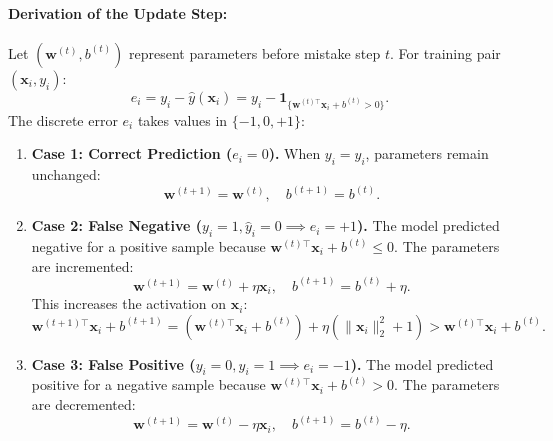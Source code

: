 \documentclass[11pt]{article}
\begin{document}
\paragraph{Derivation of the Update Step:}
Let $(\mathbf{w}^{(t)}, b^{(t)})$ represent parameters before mistake step $t$. For training pair $(\mathbf{x}_i, y_i)$:
\begin{equation}
e_i = y_i - \hat{y}(\mathbf{x}_i) = y_i - \mathbf{1}_{\{\mathbf{w}^{(t)\top} \mathbf{x}_i + b^{(t)} > 0\}}.
\end{equation}
The discrete error $e_i$ takes values in $\{-1, 0, +1\}$:
\begin{enumerate}
    \item \textbf{Case 1: Correct Prediction ($e_i = 0$).} When $y_i = \hat{y}_i$, parameters remain unchanged:
    $$\mathbf{w}^{(t+1)} = \mathbf{w}^{(t)}, \quad b^{(t+1)} = b^{(t)}.$$
    \item \textbf{Case 2: False Negative ($y_i = 1, \hat{y}_i = 0 \implies e_i = +1$).} The model predicted negative for a positive sample because $\mathbf{w}^{(t)\top} \mathbf{x}_i + b^{(t)} \le 0$. The parameters are incremented:
    $$\mathbf{w}^{(t+1)} = \mathbf{w}^{(t)} + \eta \mathbf{x}_i, \quad b^{(t+1)} = b^{(t)} + \eta.$$
    This increases the activation on $\mathbf{x}_i$:
    $$\mathbf{w}^{(t+1)\top} \mathbf{x}_i + b^{(t+1)} = (\mathbf{w}^{(t)\top} \mathbf{x}_i + b^{(t)}) + \eta (\|\mathbf{x}_i\|_2^2 + 1) > \mathbf{w}^{(t)\top} \mathbf{x}_i + b^{(t)}.$$
    \item \textbf{Case 3: False Positive ($y_i = 0, \hat{y}_i = 1 \implies e_i = -1$).} The model predicted positive for a negative sample because $\mathbf{w}^{(t)\top} \mathbf{x}_i + b^{(t)} > 0$. The parameters are decremented:
    $$\mathbf{w}^{(t+1)} = \mathbf{w}^{(t)} - \eta \mathbf{x}_i, \quad b^{(t+1)} = b^{(t)} - \eta.$$
\end{enumerate}
\end{document}
